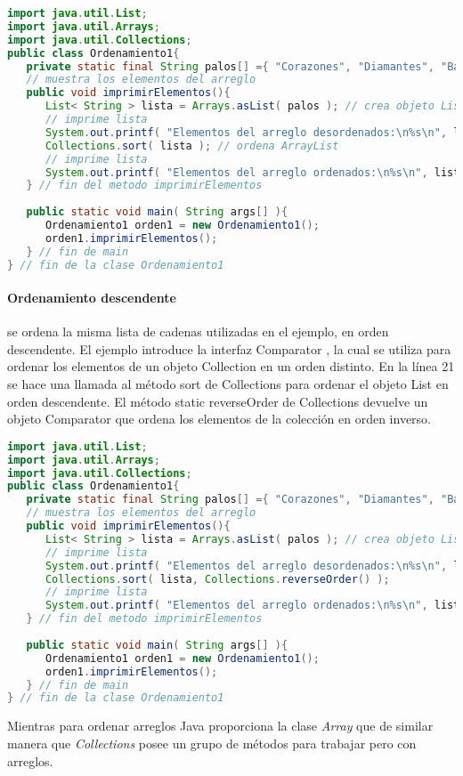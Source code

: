 \begin{lstlisting}[language=Java]
import java.util.List;
import java.util.Arrays;
import java.util.Collections;
public class Ordenamiento1{
   private static final String palos[] ={ "Corazones", "Diamantes", "Bastos", "Espadas" };
   // muestra los elementos del arreglo
   public void imprimirElementos(){
      List< String > lista = Arrays.asList( palos ); // crea objeto List
      // imprime lista
      System.out.printf( "Elementos del arreglo desordenados:\n%s\n", lista );
      Collections.sort( lista ); // ordena ArrayList
      // imprime lista
      System.out.printf( "Elementos del arreglo ordenados:\n%s\n", lista );
   } // fin del metodo imprimirElementos
   
   public static void main( String args[] ){
      Ordenamiento1 orden1 = new Ordenamiento1();
      orden1.imprimirElementos();
   } // fin de main
} // fin de la clase Ordenamiento1
\end{lstlisting} 

\paragraph{Ordenamiento descendente}
se ordena la misma lista de cadenas utilizadas en el ejemplo, en orden descendente. El ejemplo
introduce la interfaz Comparator , la cual se utiliza para ordenar los elementos de un objeto Collection en un
orden distinto. En la línea 21 se hace una llamada al método sort de Collections para ordenar el objeto List
en orden descendente. El método static reverseOrder de Collections devuelve un objeto Comparator que
ordena los elementos de la colección en orden inverso.
\begin{lstlisting}[language=Java]
import java.util.List;
import java.util.Arrays;
import java.util.Collections;
public class Ordenamiento1{
   private static final String palos[] ={ "Corazones", "Diamantes", "Bastos", "Espadas" };
   // muestra los elementos del arreglo
   public void imprimirElementos(){
      List< String > lista = Arrays.asList( palos ); // crea objeto List
      // imprime lista
      System.out.printf( "Elementos del arreglo desordenados:\n%s\n", lista );
      Collections.sort( lista, Collections.reverseOrder() );
      // imprime lista
	  System.out.printf( "Elementos del arreglo ordenados:\n%s\n", lista );
   } // fin del metodo imprimirElementos
		
   public static void main( String args[] ){
      Ordenamiento1 orden1 = new Ordenamiento1();
      orden1.imprimirElementos();
   } // fin de main
} // fin de la clase Ordenamiento1
\end{lstlisting}

Mientras para ordenar arreglos Java proporciona la clase {\em Array} que de similar manera que {\em Collections } posee un grupo de métodos para trabajar pero con arreglos.
